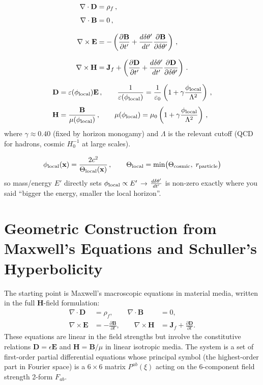 \documentclass[12pt,a4paper]{article}
\begin{document}
\begin{align}
\nabla \cdot \mathbf{D} &= \rho_f \,, \\[4pt]
\nabla \cdot \mathbf{B} &= 0 \,, \\[8pt]
\nabla \times \mathbf{E} &= -\left( \frac{\partial \mathbf{B}}{\partial t'} + \frac{d\delta\theta'}{dt'} \frac{\partial \mathbf{B}}{\partial \delta\theta'} \right) \,, \\[8pt]
\nabla \times \mathbf{H} &= \mathbf{J}_f + \left( \frac{\partial \mathbf{D}}{\partial t'} + \frac{d\delta\theta'}{dt'} \frac{\partial \mathbf{D}}{\partial \delta\theta'} \right) \,.
\end{align}

\begin{align}
\mathbf{D} &= \varepsilon(\phi_{\rm local}) \mathbf{E} \,, \qquad
\frac{1}{\varepsilon(\phi_{\rm local})} = \frac{1}{\varepsilon_0} \left(1 + \gamma \frac{\phi_{\rm local}}{\Lambda^2}\right) \,, \\[4pt]
\mathbf{H} &= \frac{\mathbf{B}}{\mu(\phi_{\rm local})} \,, \qquad
\mu(\phi_{\rm local}) = \mu_0 \left(1 + \gamma \frac{\phi_{\rm local}}{\Lambda^2}\right) \,,
\end{align}
where \( \gamma \approx 0.40 \) (fixed by horizon monogamy) and \( \Lambda \) is the relevant cutoff (QCD for hadrons, cosmic \( H_0^{-1} \) at large scales).

\[
\phi_{\rm local}(\mathbf{x}) = \frac{2c^2}{\Theta_{\rm local}(\mathbf{x})} \,, \qquad
\Theta_{\rm local} = \min\bigl(\Theta_{\rm cosmic},\; r_{\rm particle}\bigr)
\]
so mass/energy \( E' \) directly sets \( \phi_{\rm local} \propto E' \) → \( \frac{d\delta\theta'}{dt'} \) is non-zero exactly where you said “bigger the energy, smaller the local horizon”.

\section{Geometric Construction from Maxwell's Equations and Schuller's Hyperbolicity}
\label{sec:maxwell-schuller}

The starting point is Maxwell's macroscopic equations in material media, written in the full $\mathbf{H}$-field formulation:
\begin{align}
\nabla \cdot \mathbf{D} &= \rho_f, \qquad
\nabla \cdot \mathbf{B} &= 0, \\
\nabla \times \mathbf{E} &= -\frac{\partial \mathbf{B}}{\partial t}, \qquad
\nabla \times \mathbf{H} &= \mathbf{J}_f + \frac{\partial \mathbf{D}}{\partial t}.
\end{align}
These equations are linear in the field strengths but involve the constitutive relations $\mathbf{D}=\epsilon\mathbf{E}$ and $\mathbf{H}=\mathbf{B}/\mu$ in linear isotropic media. The system is a set of first-order partial differential equations whose principal symbol (the highest-order part in Fourier space) is a $6\times6$ matrix $P^{ab}(\xi)$ acting on the 6-component field strength 2-form $F_{ab}$.
\end{document}
